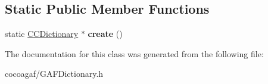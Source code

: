 \subsection*{Static Public Member Functions}
\begin{DoxyCompactItemize}
\item 
\hypertarget{class_g_a_f_1_1_c_c_dictionary_a2496598cd2863df0920eea866a71312f}{static \hyperlink{class_g_a_f_1_1_c_c_dictionary}{C\-C\-Dictionary} $\ast$ {\bfseries create} ()}\label{class_g_a_f_1_1_c_c_dictionary_a2496598cd2863df0920eea866a71312f}

\end{DoxyCompactItemize}


The documentation for this class was generated from the following file\-:\begin{DoxyCompactItemize}
\item 
cocoagaf/G\-A\-F\-Dictionary.\-h\end{DoxyCompactItemize}
